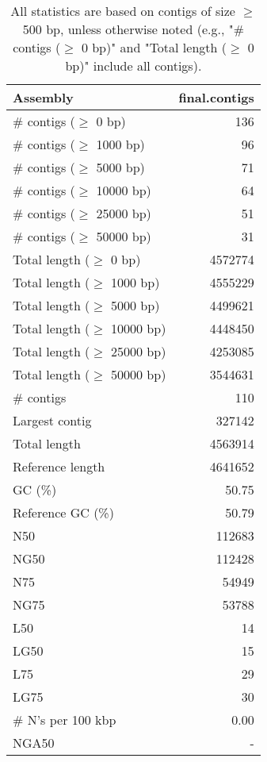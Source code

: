 \documentclass[12pt,a4paper]{article}
\begin{document}
\begin{table}[ht]
\begin{center}
\caption{All statistics are based on contigs of size $\geq$ 500 bp, unless otherwise noted (e.g., "\# contigs ($\geq$ 0 bp)" and "Total length ($\geq$ 0 bp)" include all contigs).}
\begin{tabular}{|l*{1}{|r}|}
\hline
Assembly & final.contigs \\ \hline
\# contigs ($\geq$ 0 bp) & 136 \\ \hline
\# contigs ($\geq$ 1000 bp) & 96 \\ \hline
\# contigs ($\geq$ 5000 bp) & 71 \\ \hline
\# contigs ($\geq$ 10000 bp) & 64 \\ \hline
\# contigs ($\geq$ 25000 bp) & 51 \\ \hline
\# contigs ($\geq$ 50000 bp) & 31 \\ \hline
Total length ($\geq$ 0 bp) & 4572774 \\ \hline
Total length ($\geq$ 1000 bp) & 4555229 \\ \hline
Total length ($\geq$ 5000 bp) & 4499621 \\ \hline
Total length ($\geq$ 10000 bp) & 4448450 \\ \hline
Total length ($\geq$ 25000 bp) & 4253085 \\ \hline
Total length ($\geq$ 50000 bp) & 3544631 \\ \hline
\# contigs & 110 \\ \hline
Largest contig & 327142 \\ \hline
Total length & 4563914 \\ \hline
Reference length & 4641652 \\ \hline
GC (\%) & 50.75 \\ \hline
Reference GC (\%) & 50.79 \\ \hline
N50 & 112683 \\ \hline
NG50 & 112428 \\ \hline
N75 & 54949 \\ \hline
NG75 & 53788 \\ \hline
L50 & 14 \\ \hline
LG50 & 15 \\ \hline
L75 & 29 \\ \hline
LG75 & 30 \\ \hline
\# N's per 100 kbp & 0.00 \\ \hline
NGA50 & - \\ \hline
\end{tabular}
\end{center}
\end{table}
\end{document}
